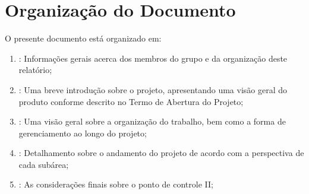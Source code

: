 	\section{Organização do Documento}
	\label{sec:apresentacao_organizacao}

		O presente documento está organizado em: 

		\begin{enumerate}
			\item{\textbf{}: Informações gerais acerca dos membros do grupo e da organização deste relatório;}
			\item{\textbf{}: Uma breve introdução sobre o projeto, apresentando uma visão geral do produto conforme descrito no Termo de Abertura do Projeto;}
			\item{\textbf{}: Uma visão geral sobre a organização do trabalho, bem como a forma de gerenciamento ao longo do projeto;}
			\item{\textbf{}: Detalhamento sobre o andamento do projeto de acordo com a perspectiva de cada subárea;}
			\item{\textbf{}: As considerações finais sobre o ponto de controle II;}
		\end{enumerate}

